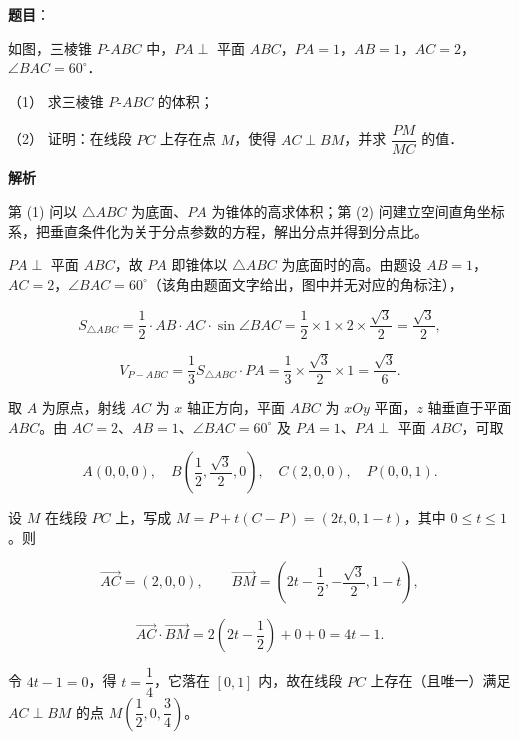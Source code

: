 \begin{answer}

\textbf{题目}：

如图，三棱锥 \(P\text{-}ABC\) 中，\(PA\perp\) 平面 \(ABC\)，\(PA=1\)，\(AB=1\)，\(AC=2\)，\(\angle BAC=60^{\circ}\)．
\nopagebreak[4]
\begin{center}\end{center}
\nopagebreak[4]
（1） 求三棱锥 \(P\text{-}ABC\) 的体积；

（2） 证明：在线段 \(PC\) 上存在点 \(M\)，使得 \(AC\perp BM\)，并求 \(\dfrac{PM}{MC}\) 的值．

\textbf{解析}

第 (1) 问以 \(\triangle ABC\) 为底面、\(PA\) 为锥体的高求体积；第 (2) 问建立空间直角坐标系，把垂直条件化为关于分点参数的方程，解出分点并得到分点比。


\(PA\perp\) 平面 \(ABC\)，故 \(PA\) 即锥体以 \(\triangle ABC\) 为底面时的高。由题设 \(AB=1\)，\(AC=2\)，\(\angle BAC=60^{\circ}\)（该角由题面文字给出，图中并无对应的角标注），

\nopagebreak[4]
\[
S_{\triangle ABC}=\dfrac{1}{2}\cdot AB\cdot AC\cdot\sin\angle BAC=\dfrac{1}{2}\times1\times2\times\dfrac{\sqrt{3}}{2}=\dfrac{\sqrt{3}}{2},
\]

\nopagebreak[4]
\[
V_{P-ABC}=\dfrac{1}{3}S_{\triangle ABC}\cdot PA=\dfrac{1}{3}\times\dfrac{\sqrt{3}}{2}\times1=\dfrac{\sqrt{3}}{6}.
\]


取 \(A\) 为原点，射线 \(AC\) 为 \(x\) 轴正方向，平面 \(ABC\) 为 \(xOy\) 平面，\(z\) 轴垂直于平面 \(ABC\)。由 \(AC=2\)、\(AB=1\)、\(\angle BAC=60^{\circ}\) 及 \(PA=1\)、\(PA\perp\) 平面 \(ABC\)，可取

\nopagebreak[4]
\[
A(0,0,0),\quad B\left(\dfrac{1}{2},\dfrac{\sqrt{3}}{2},0\right),\quad C(2,0,0),\quad P(0,0,1).
\]

设 \(M\) 在线段 \(PC\) 上，写成 \(M=P+t(C-P)=(2t,0,1-t)\)，其中 \(0\leqslant t\leqslant1\)。则

\nopagebreak[4]
\[
\overrightarrow{AC}=(2,0,0),\qquad \overrightarrow{BM}=\left(2t-\dfrac{1}{2},-\dfrac{\sqrt{3}}{2},1-t\right),
\]

\nopagebreak[4]
\[
\overrightarrow{AC}\cdot\overrightarrow{BM}=2\left(2t-\dfrac{1}{2}\right)+0+0=4t-1 .
\]

令 \(4t-1=0\)，得 \(t=\dfrac{1}{4}\)，它落在 \([0,1]\) 内，故在线段 \(PC\) 上存在（且唯一）满足 \(AC\perp BM\) 的点 \(M\left(\dfrac{1}{2},0,\dfrac{3}{4}\right)\)。


\end{answer}
